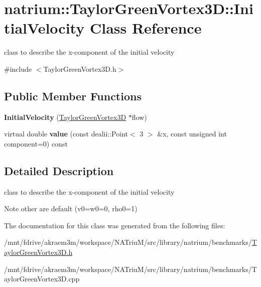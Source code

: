 \hypertarget{classnatrium_1_1TaylorGreenVortex3D_1_1InitialVelocity}{
\section{natrium::TaylorGreenVortex3D::InitialVelocity Class Reference}
\label{classnatrium_1_1TaylorGreenVortex3D_1_1InitialVelocity}
}


class to describe the x-\/component of the initial velocity  


{\ttfamily \#include $<$TaylorGreenVortex3D.h$>$}\subsection*{Public Member Functions}
\begin{DoxyCompactItemize}
\item 
\hypertarget{classnatrium_1_1TaylorGreenVortex3D_1_1InitialVelocity_a510bf7d3646ca627bcf6a00c8f3e9e84}{
{\bfseries InitialVelocity} (\hyperlink{classnatrium_1_1TaylorGreenVortex3D}{TaylorGreenVortex3D} $\ast$flow)}
\label{classnatrium_1_1TaylorGreenVortex3D_1_1InitialVelocity_a510bf7d3646ca627bcf6a00c8f3e9e84}

\item 
\hypertarget{classnatrium_1_1TaylorGreenVortex3D_1_1InitialVelocity_a70dcea373e4bb7d642e1a71dc8ce47d7}{
virtual double {\bfseries value} (const dealii::Point$<$ 3 $>$ \&x, const unsigned int component=0) const }
\label{classnatrium_1_1TaylorGreenVortex3D_1_1InitialVelocity_a70dcea373e4bb7d642e1a71dc8ce47d7}

\end{DoxyCompactItemize}


\subsection{Detailed Description}
class to describe the x-\/component of the initial velocity \begin{DoxyNote}{Note}
other are default (v0=w0=0, rho0=1) 
\end{DoxyNote}


The documentation for this class was generated from the following files:\begin{DoxyCompactItemize}
\item 
/mnt/fdrive/akraem3m/workspace/NATriuM/src/library/natrium/benchmarks/\hyperlink{TaylorGreenVortex3D_8h}{TaylorGreenVortex3D.h}\item 
/mnt/fdrive/akraem3m/workspace/NATriuM/src/library/natrium/benchmarks/TaylorGreenVortex3D.cpp\end{DoxyCompactItemize}
